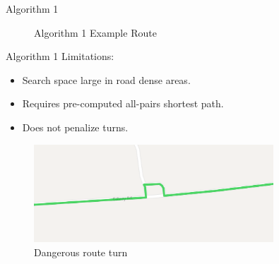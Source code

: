\documentclass{beamer}
\begin{document}
\begin{frame}{Algorithm 1 \cite{verbeeck2014extension}}
\begin{figure}
\caption{Algorithm 1 Example Route}
\end{figure}
\end{frame}

\begin{frame}{Algorithm 1 \cite{verbeeck2014extension}}
Limitations:
\begin{itemize}
    \item Search space large in road dense areas.
    \item Requires pre-computed all-pairs shortest path.
    \item Does not penalize turns.
\end{itemize}
\begin{figure}
\begin{center}
\includegraphics[width=0.8\textwidth]{figs/vva_route_turn}
\end{center}
\caption{Dangerous route turn}
\end{figure}
\end{frame}
\end{document}
